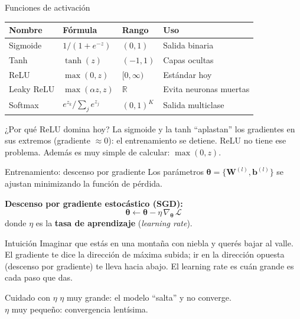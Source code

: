 \documentclass[aspectratio=169]{beamer}
\newcommand{\R}{\mathbb{R}}
\begin{document}
\begin{frame}{Funciones de activación}
  \begin{center}
  \begin{tabular}{llll}
    \toprule
    \textbf{Nombre} & \textbf{Fórmula} & \textbf{Rango} & \textbf{Uso} \\
    \midrule
    Sigmoide    & $1/(1+e^{-z})$          & $(0,1)$    & Salida binaria \\
    Tanh        & $\tanh(z)$              & $(-1,1)$   & Capas ocultas \\
    ReLU        & $\max(0,z)$             & $[0,\infty)$ & Estándar hoy \\
    Leaky ReLU  & $\max(\alpha z,z)$      & $\R$       & Evita neuronas muertas \\
    Softmax     & $e^{z_k}/\sum_j e^{z_j}$ & $(0,1)^K$ & Salida multiclase \\
    \bottomrule
  \end{tabular}
  \end{center}

  \medskip
  \begin{exampleblock}{¿Por qué ReLU domina hoy?}
    La sigmoide y la tanh ``aplastan'' los gradientes en sus extremos (gradiente $\approx 0$):
    el entrenamiento se detiene. ReLU no tiene ese problema.
    Además es muy simple de calcular: $\max(0,z)$.
  \end{exampleblock}
\end{frame}

\begin{frame}{Entrenamiento: descenso por gradiente}
  Los parámetros $\bm{\theta} = \{\bm{W}^{(l)}, \bm{b}^{(l)}\}$ se ajustan minimizando la función de pérdida.

  \medskip
  \textbf{Descenso por gradiente estocástico (SGD):}
  \[
    \bm{\theta} \leftarrow \bm{\theta} - \eta\, \nabla_{\bm{\theta}}\, \mathcal{L}
  \]
  donde $\eta$ es la \textbf{tasa de aprendizaje} (\textit{learning rate}).

  \medskip
  \begin{exampleblock}{Intuición}
    Imaginar que estás en una montaña con niebla y querés bajar al valle.
    El gradiente te dice la dirección de máxima subida; ir en la dirección opuesta
    (descenso por gradiente) te lleva hacia abajo.
    El learning rate es cuán grande es cada paso que das.
  \end{exampleblock}

  \medskip
  \begin{alertblock}{Cuidado con $\eta$}
    $\eta$ muy grande: el modelo ``salta'' y no converge.\\
    $\eta$ muy pequeño: convergencia lentísima.
  \end{alertblock}
\end{frame}
\end{document}
